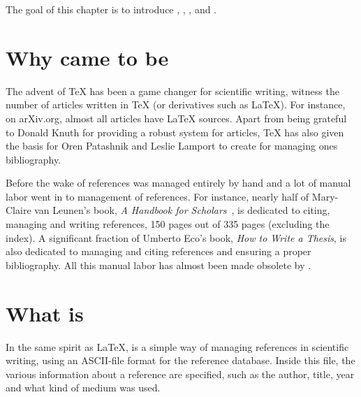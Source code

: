 The goal of this chapter is to introduce {\bibtex},
,
, 
and .



\section{Why {\bibtex} came to be}
\label{sec:why_bibtex_came_to_be}

The advent of {\TeX} has been a game changer for scientific writing,
witness the number of articles written in {\TeX} (or derivatives such
as {\LaTeX}).  For instance, on arXiv.org, almost all articles have
{\LaTeX} sources.  Apart from being grateful to Donald Knuth for
providing a robust system for articles, {\TeX} has also given the
basis for Oren Patashnik and Leslie Lamport to create {\bibtex} for
managing ones bibliography.

Before the wake of {\bibtex} references was managed entirely by hand
and a lot of manual labor went in to management of references.  For
instance, nearly half of Mary-Claire van Leunen's book, \textit{A
  Handbook for Scholars}~\cite{leunen1992_handbook}, is dedicated to
citing, managing and writing references, 150 pages out of 335 pages
(excluding the index).  A significant fraction of Umberto Eco's book,
\textit{How to Write a Thesis}, is also dedicated to managing and
citing references and ensuring a proper bibliography.  All this manual
labor has almost been made obsolete by {\bibtex}.


\section{What is {\bibtex}}
\label{sec:principles_of_bibtex}

In the same spirit as {\LaTeX}, {\bibtex} is a simple way of managing
references in scientific writing, using an ASCII-file format for the
reference database.  Inside this file, the various information about a
reference are specified, such as the author, title, year and what kind
of medium was used.

